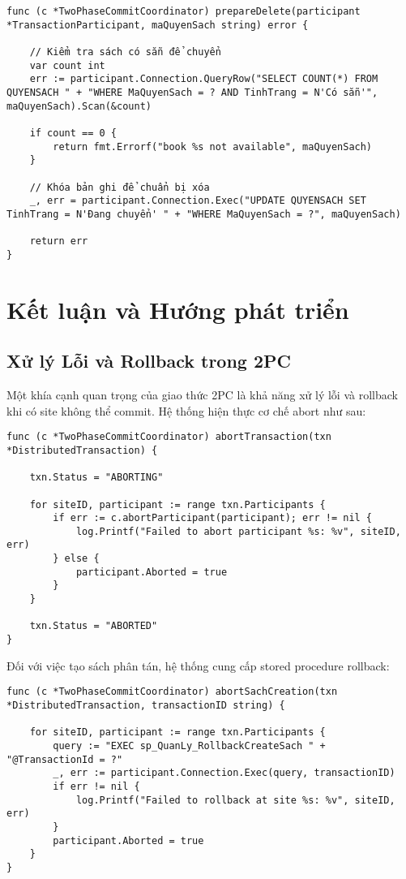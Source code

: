 \documentclass[conference]{IEEEtran}
\begin{document}
\begin{Verbatim}[fontsize=\footnotesize,breaklines=true,breakanywhere=true]
func (c *TwoPhaseCommitCoordinator) prepareDelete(participant *TransactionParticipant, maQuyenSach string) error {

    // Kiểm tra sách có sẵn để chuyển
    var count int
    err := participant.Connection.QueryRow("SELECT COUNT(*) FROM QUYENSACH " + "WHERE MaQuyenSach = ? AND TinhTrang = N'Có sẵn'", maQuyenSach).Scan(&count)

    if count == 0 {
        return fmt.Errorf("book %s not available", maQuyenSach)
    }
    
    // Khóa bản ghi để chuẩn bị xóa
    _, err = participant.Connection.Exec("UPDATE QUYENSACH SET TinhTrang = N'Đang chuyển' " + "WHERE MaQuyenSach = ?", maQuyenSach)

    return err
}
\end{Verbatim}

\section{Kết luận và Hướng phát triển}
\subsection{Xử lý Lỗi và Rollback trong 2PC}
Một khía cạnh quan trọng của giao thức 2PC là khả năng xử lý lỗi và rollback khi có site không thể commit. Hệ thống hiện thực cơ chế abort như sau:

\begin{Verbatim}[fontsize=\footnotesize,breaklines=true,breakanywhere=true]
func (c *TwoPhaseCommitCoordinator) abortTransaction(txn *DistributedTransaction) {
    
    txn.Status = "ABORTING"
    
    for siteID, participant := range txn.Participants {
        if err := c.abortParticipant(participant); err != nil {
            log.Printf("Failed to abort participant %s: %v", siteID, err)
        } else {
            participant.Aborted = true
        }
    }
    
    txn.Status = "ABORTED"
}
\end{Verbatim}

Đối với việc tạo sách phân tán, hệ thống cung cấp stored procedure rollback:

\begin{Verbatim}[fontsize=\footnotesize,breaklines=true,breakanywhere=true]
func (c *TwoPhaseCommitCoordinator) abortSachCreation(txn *DistributedTransaction, transactionID string) {
    
    for siteID, participant := range txn.Participants {
        query := "EXEC sp_QuanLy_RollbackCreateSach " + "@TransactionId = ?"
        _, err := participant.Connection.Exec(query, transactionID)
        if err != nil {
            log.Printf("Failed to rollback at site %s: %v", siteID, err)
        }
        participant.Aborted = true
    }
}
\end{Verbatim}
\end{document}
